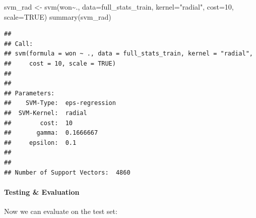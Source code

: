 \documentclass[
]{article}
\newenvironment{Shaded}{\begin{snugshade}}{\end{snugshade}}
\newcommand{\AttributeTok}[1]{\textcolor[rgb]{0.77,0.63,0.00}{#1}}
\newcommand{\ConstantTok}[1]{\textcolor[rgb]{0.00,0.00,0.00}{#1}}
\newcommand{\DecValTok}[1]{\textcolor[rgb]{0.00,0.00,0.81}{#1}}
\newcommand{\FloatTok}[1]{\textcolor[rgb]{0.00,0.00,0.81}{#1}}
\newcommand{\FunctionTok}[1]{\textcolor[rgb]{0.00,0.00,0.00}{#1}}
\newcommand{\NormalTok}[1]{#1}
\newcommand{\OtherTok}[1]{\textcolor[rgb]{0.56,0.35,0.01}{#1}}
\newcommand{\SpecialCharTok}[1]{\textcolor[rgb]{0.00,0.00,0.00}{#1}}
\newcommand{\StringTok}[1]{\textcolor[rgb]{0.31,0.60,0.02}{#1}}
\begin{document}
\begin{Shaded}
\begin{Highlighting}[]
\NormalTok{svm\_rad }\OtherTok{\textless{}{-}} \FunctionTok{svm}\NormalTok{(won}\SpecialCharTok{\textasciitilde{}}\NormalTok{., }\AttributeTok{data=}\NormalTok{full\_stats\_train, }\AttributeTok{kernel=}\StringTok{"radial"}\NormalTok{, }\AttributeTok{cost=}\DecValTok{10}\NormalTok{, }\AttributeTok{scale=}\ConstantTok{TRUE}\NormalTok{)}
\FunctionTok{summary}\NormalTok{(svm\_rad)}
\end{Highlighting}
\end{Shaded}

\begin{verbatim}
## 
## Call:
## svm(formula = won ~ ., data = full_stats_train, kernel = "radial", 
##     cost = 10, scale = TRUE)
## 
## 
## Parameters:
##    SVM-Type:  eps-regression 
##  SVM-Kernel:  radial 
##        cost:  10 
##       gamma:  0.1666667 
##     epsilon:  0.1 
## 
## 
## Number of Support Vectors:  4860
\end{verbatim}

\hypertarget{testing-evaluation-2}{%
\paragraph{Testing \& Evaluation}\label{testing-evaluation-2}}

Now we can evaluate on the test set:

\begin{Shaded}
\end{Shaded}
\end{document}
